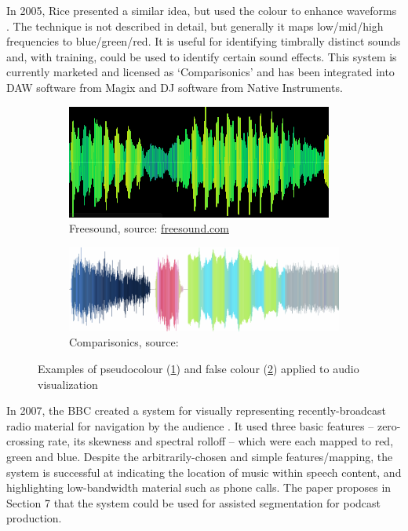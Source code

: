 In 2005, Rice presented a similar idea, but used the colour to enhance
waveforms \citep{Rice2005}. The technique is not described in detail, but
generally it maps low/mid/high frequencies to blue/green/red. It is useful for
identifying timbrally distinct sounds and, with training, could be used to
identify certain sound effects. This system is currently marketed and licensed
as `Comparisonics' and has been integrated into DAW software from Magix and DJ
software from Native Instruments.

\begin{figure}[ht]
\centering
\begin{subfigure}{.5\textwidth}
  \centering
  \includegraphics[width=\linewidth]{figs/freesound.png}
  \caption{Freesound, source: \url{freesound.com}}
  \label{fig:freesound}
\end{subfigure}%
\begin{subfigure}{.5\textwidth}
  \centering
  \includegraphics[width=\linewidth]{figs/rice.png}
  \caption{Comparisonics, source: \citep{Rice2005}}
  \label{fig:rice}
\end{subfigure}
\caption{Examples of pseudocolour (\ref{fig:freesound}) and false colour
  (\ref{fig:rice}) applied to audio visualization}
\label{fig:colourvis}
\end{figure}

In 2007, the BBC created a system for visually representing recently-broadcast
radio material for navigation by the audience \citep{Mason2007}. It used three
basic features -- zero-crossing rate, its skewness and spectral rolloff --
which were each mapped to red, green and blue. Despite the arbitrarily-chosen
and simple features/mapping, the system is successful at indicating the
location of music within speech content, and highlighting low-bandwidth
material such as phone calls. The paper proposes in Section 7 that the system
could be used for assisted segmentation for podcast production.

